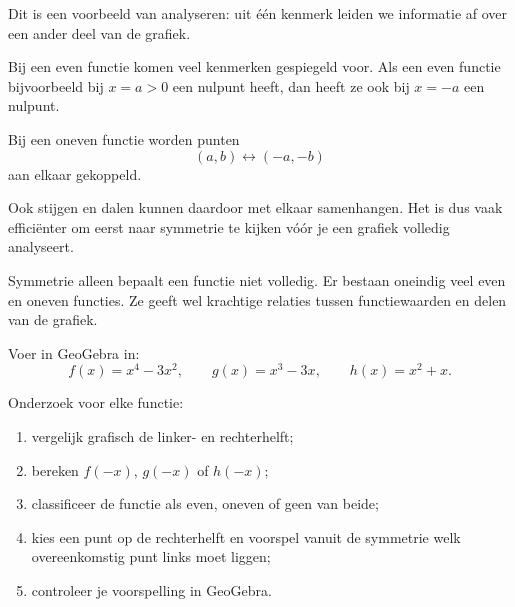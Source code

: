 \documentclass{ximera}
\begin{document}
Dit is een voorbeeld van analyseren: uit één kenmerk leiden we informatie af
over een ander deel van de grafiek.


Bij een even functie komen veel kenmerken gespiegeld voor.
Als een even functie bijvoorbeeld bij \(x=a>0\) een nulpunt heeft,
dan heeft ze ook bij \(x=-a\) een nulpunt.

Bij een oneven functie worden punten
\[
(a,b)\longleftrightarrow(-a,-b)
\]
aan elkaar gekoppeld.

Ook stijgen en dalen kunnen daardoor met elkaar samenhangen.
Het is dus vaak efficiënter om eerst naar symmetrie te kijken vóór je een grafiek
volledig analyseert.

\begin{opmerking}
Symmetrie alleen bepaalt een functie niet volledig. Er bestaan oneindig veel even
en oneven functies. Ze geeft wel krachtige relaties tussen functiewaarden en
delen van de grafiek.
\end{opmerking}

\begin{geogebra}
Voer in GeoGebra in:
\[
f(x)=x^4-3x^2,\qquad
g(x)=x^3-3x,\qquad
h(x)=x^2+x.
\]

Onderzoek voor elke functie:
\begin{enumerate}
  \item vergelijk grafisch de linker- en rechterhelft;
  \item bereken \(f(-x)\), \(g(-x)\) of \(h(-x)\);
  \item classificeer de functie als even, oneven of geen van beide;
  \item kies een punt op de rechterhelft en voorspel vanuit de symmetrie
        welk overeenkomstig punt links moet liggen;
  \item controleer je voorspelling in GeoGebra.
\end{enumerate}
\end{geogebra}
\end{document}

